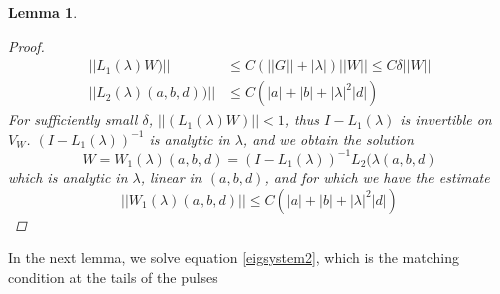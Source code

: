 \documentclass[12pt]{article}
\newtheorem{lemma}{Lemma}
\begin{document}
\begin{lemma}
\begin{proof}
\begin{align*}
||L_1(\lambda)W)|| &\leq C \left(||G|| + |\lambda| \right)||W|| \leq C \delta ||W|| \\
||L_2(\lambda)(a,b,d))|| &\leq C\left( |a| + |b| + |\lambda|^2 |d| \right)
\end{align*}
For sufficiently small $\delta$, $||(L_1(\lambda)W)|| < 1$, thus $I - L_1(\lambda)$ is invertible on $V_W$. $(I - L_1(\lambda))^{-1}$ is analytic in $\lambda$, and we obtain the solution 
\[
W = W_1(\lambda)(a,b,d) = (I - L_1(\lambda))^{-1} L_2(\lambda(a,b,d)
\]
which is analytic in $\lambda$, linear in $(a, b, d)$, and for which we have the estimate
\begin{equation*}
||W_1(\lambda)(a,b,d)|| \leq C \left( |a| + |b| + |\lambda|^2 |d| \right)
\end{equation*}
\end{proof}
\end{lemma}

In the next lemma, we solve equation \eqref{eigsystem2}, which is the matching condition at the tails of the pulses
\end{document}
